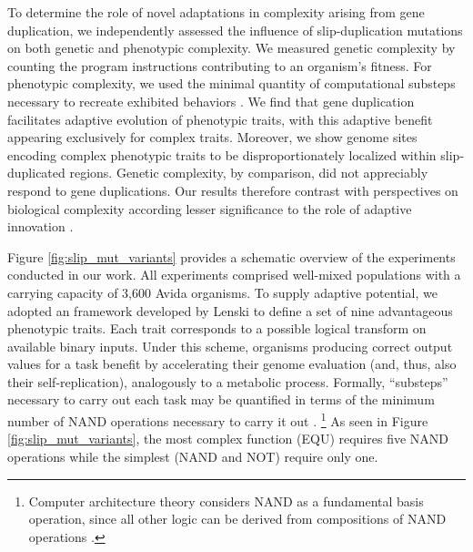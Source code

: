 To determine the role of novel adaptations in complexity arising from gene duplication, we independently assessed the influence of slip-duplication mutations on both genetic and phenotypic complexity.
We measured genetic complexity by counting the program instructions contributing to an organism's fitness.
For phenotypic complexity, we used the minimal quantity of computational substeps necessary to recreate exhibited behaviors \citet{Lenski2003Evolutionary}.
We find that gene duplication facilitates adaptive evolution of phenotypic traits, with this adaptive benefit appearing exclusively for complex traits.
Moreover, we show genome sites encoding complex phenotypic traits to be disproportionately localized within slip-duplicated regions.
Genetic complexity, by comparison, did not appreciably respond to gene duplications.
Our results therefore contrast with perspectives on biological complexity according lesser significance to the role of adaptive innovation \citep{Lynch2000,Beslon2021,Lynch2007}.

Figure \ref{fig:slip_mut_variants} provides a schematic overview of the experiments conducted in our work.
All experiments comprised well-mixed populations with a carrying capacity of 3,600 Avida organisms.
To supply adaptive potential, we adopted an framework developed by Lenski \citet{Lenski2003Evolutionary} to define a set of nine advantageous phenotypic traits.
Each trait corresponds to a possible logical transform on available binary inputs.
Under this scheme, organisms producing correct output values for a task benefit by accelerating their genome evaluation (and, thus, also their self-replication), analogously to a metabolic process.
Formally, ``substeps'' necessary to carry out each task may be quantified in terms of the minimum number of NAND operations necessary to carry it out \citep{Lenski2003Evolutionary}.%
\footnote{
Computer architecture theory considers NAND as a fundamental basis operation, since all other logic can be derived from compositions of NAND operations \citep{mano1997logic}.
}
As seen in Figure \ref{fig:slip_mut_variants}, the most complex function (EQU) requires five NAND operations while the simplest (NAND and NOT) require only one.

